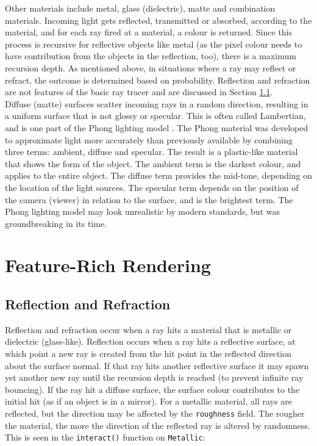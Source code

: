 \documentclass[a4paper]{article}
\begin{document}
Other materials include metal, glass (dielectric), matte and combination materials. Incoming light gets reflected, transmitted or absorbed, according to the material, and for each ray fired at a material, a colour is returned. Since this process is recursive for reflective objects like metal (as the pixel colour needs to have contribution from the objects in the reflection, too), there is a maximum recursion depth. As mentioned above, in situations where a ray may reflect or refract, the outcome is determined based on probability. Reflection and refraction are not features of the basic ray tracer and are discussed in Section \ref{ss:reflandrefr}.\\

Diffuse (matte) surfaces scatter incoming rays in a random direction, resulting in a uniform surface that is not glossy or specular. This is often called Lambertian, and is one part of the Phong lighting model \cite{Phong1975lighting}. The Phong material was developed to approximate light more accurately than previously available by combining three terms: ambient, diffuse and specular. The result is a plastic-like material that shows the form of the object. The ambient term is the darkest colour, and applies to the entire object. The diffuse term provides the mid-tone, depending on the location of the light sources. The specular term depends on the position of the camera (viewer) in relation to the surface, and is the brightest term. The Phong lighting model may look unrealistic by modern standards, but was groundbreaking in its time.\\

\section{Feature-Rich Rendering}
\subsection{Reflection and Refraction}\label{ss:reflandrefr}
Reflection and refraction occur when a ray hits a material that is metallic or dielectric (glass-like). Reflection occurs when a ray hits a reflective surface, at which point a new ray is created from the hit point in the reflected direction about the surface normal. If that ray hits another reflective surface it may spawn yet another new ray until the recursion depth is reached (to prevent infinite ray bouncing). If the ray hit a diffuse surface, the surface colour contributes to the initial hit (as if an object is in a mirror). For a metallic material, all rays are reflected, but the direction may be affected by the \texttt{roughness} field. The rougher the material, the more the direction of the reflected ray is altered by randomness. This is seen  in the \texttt{interact()} function on \texttt{Metallic}:
\end{document}
